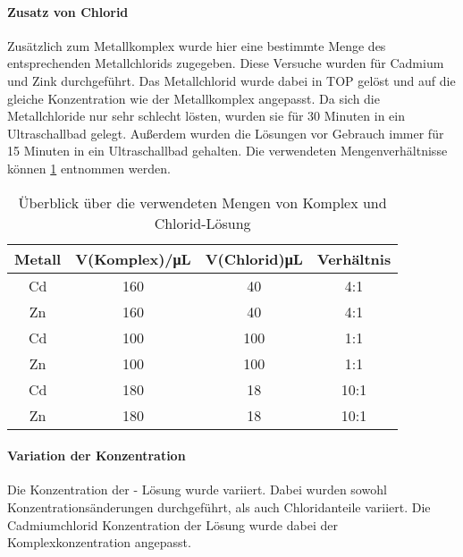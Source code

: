 				\paragraph{Zusatz von Chlorid}
				\qquad\newline
					Zusätzlich zum Metallkomplex wurde hier eine bestimmte Menge des entsprechenden Metallchlorids zugegeben.
					Diese Versuche wurden für Cadmium und Zink durchgeführt.
					Das Metallchlorid wurde dabei in TOP gelöst und auf die gleiche Konzentration wie der Metallkomplex angepasst.
					Da sich die Metallchloride nur sehr schlecht lösten, wurden sie für 30 Minuten in ein Ultraschallbad gelegt.
					Außerdem wurden die Lösungen vor Gebrauch immer für 15 Minuten in ein Ultraschallbad gehalten. 
					Die verwendeten Mengenverhältnisse können \cref{tab:Chlorid} entnommen werden.
					
					\begin{table}[htbp]
						\centering
						\caption{Überblick über die verwendeten Mengen von Komplex und Chlorid-Lösung}
						\label{tab:Chlorid}
						\begin{tabular}{cccc}
							\toprule
							Metall & V(Komplex)/\si{\micro\liter} & V(Chlorid)\si{\micro\liter} & Verhältnis \\ 
							\midrule
							Cd & 160 & 40 & 4:1\\
							Zn & 160 & 40 & 4:1\\
							Cd & 100 & 100 & 1:1\\
							Zn & 100 & 100 & 1:1\\
							Cd & 180 & 18 & 10:1\\
							Zn & 180 & 18 & 10:1\\
							\bottomrule
						\end{tabular}
					\end{table}
				
				\paragraph{Variation der Konzentration}
				\qquad\newline
					Die Konzentration der  - Lösung wurde variiert. 
					Dabei wurden sowohl Konzentrationsänderungen durchgeführt, als auch Chloridanteile variiert.
					Die Cadmiumchlorid Konzentration der Lösung wurde dabei der Komplexkonzentration angepasst.  
					
